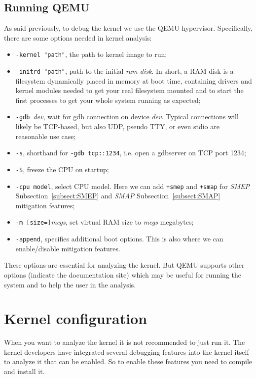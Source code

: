\documentclass{masterthesis}
\newcommand{\refToSubSection}[1]{Subsection~\ref{subsect:#1}\xspace}
\begin{document}
\subsection{Running QEMU}
\label{subsect:QEMU}
As said previously, to debug the kernel we use the QEMU hypervisor. Specifically, there are some options needed in kernel analysis:
\begin{itemize}
\item \texttt{-kernel  "path"}, the path to kernel image to run;
\item \texttt{-initrd "path"}, path to the initial \emph{ram disk}. In short, a RAM disk is a filesystem dynamically placed in memory at boot time, containing drivers and kernel modules needed to get your real filesystem mounted and to start the first processes to get your whole system running as expected;
\item \texttt{-gdb }\textit{dev}, wait for gdb connection on device \textit{dev}. Typical connections will likely be TCP-based, but also UDP, pseudo TTY, or even stdio are reasonable use case;
\item \texttt{-s}, shorthand for \texttt{-gdb tcp::1234}, i.e. open a gdbserver on TCP port 1234;
\item \texttt{-S}, freeze the CPU on startup;
\item \texttt{-cpu model}, select CPU model. Here we can add \texttt{+smep} and \texttt{+smap} for \emph{SMEP} \refToSubSection{SMEP} and \emph{SMAP} \refToSubSection{SMAP} mitigation features;
\item \texttt{-m [size=]}\textit{megs}, set virtual RAM size to \textit{megs} megabytes;
\item \texttt{-append}, specifies additional boot options. This is also where we can enable/disable mitigation features.
\end{itemize}
These options are essential for analyzing the kernel. But QEMU supports other options (indicate the documentation site) which may be useful for running the system and to help the user in the analysis.
\section{Kernel configuration}
\label{sect:configuration}
When you want to analyze the kernel it is not recommended to just run it. The kernel developers have integrated several debugging features into the kernel itself to analyze it that can be enabled.
So to enable these features you need to compile and install it.
\end{document}
